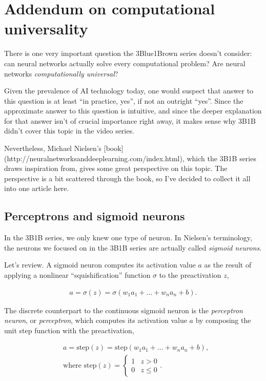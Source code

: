 \documentclass{article}
\begin{document}
	\section*{Addendum on computational universality}
	
	There is one very important question the 3Blue1Brown series doesn't consider: can neural networks actually solve every computational problem? Are neural networks \textit{computationally universal}?
	
	Given the prevalence of AI technology today, one would suspect that answer to this question is at least ``in practice, yes'', if not an outright ``yes''. Since the approximate answer to this question is intuitive, and since the deeper explanation for that answer isn't of crucial importance right away, it makes sense why 3B1B didn't cover this topic in the video series. 
	
	Nevertheless, Michael Nielsen's [book](http://neuralnetworksanddeeplearning.com/index.html), which the 3B1B series draws inspiration from, gives some great perspective on this topic. The perspective is a bit scattered through the book, so I've decided to collect it all into one article here.
	
	\subsection*{Perceptrons and sigmoid neurons}
	
	In the 3B1B series, we only knew one type of neuron. In Nielsen's terminology, the neurons we focused on in the 3B1B series are actually called \textit{sigmoid neurons}.
	
	Let's review. A sigmoid neuron computes its activation value $a$ as the result of applying a nonlinear ``squishification'' function $\sigma$ to the preactivation $z$,
	
	\begin{align*}
		a = \sigma(z) = \sigma(w_1 a_1 + ... + w_n a_n + b).
	\end{align*}
	
	The discrete counterpart to the continuous sigmoid neuron is the \textit{perceptron neuron}, or \textit{perceptron}, which computes its activation value $a$ by composing the unit step function with the preactivation,
	
	\begin{align*}
		&a = \text{step}(z)
		= \text{step}(w_1 a_1 + ... + w_n a_n + b), \\
		&\text{where } \text{step}(z) =
		\begin{cases}
			1 & z > 0 \\
			0 & z \leq 0
		\end{cases}.
	\end{align*}		
	
\end{document}
